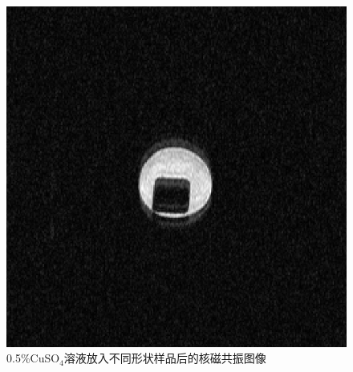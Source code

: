 \documentclass[font=default]{mpltx}
\begin{document}
\begin{figure}[]
{\begin{minipage}[b]{0.31\linewidth}
      \includegraphics[width=\linewidth]{fig/0.5+square.PNG}
    \end{minipage}
  }
  \caption{0.5\%CuSO$_4$溶液放入不同形状样品后的核磁共振图像}
  \label{figure:NMRI} 
\end{figure}
\end{document}
